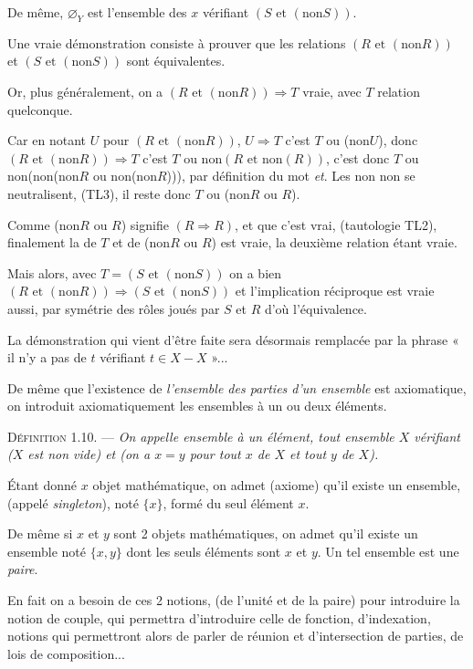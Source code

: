 De même, $\varnothing_Y$ est l'ensemble des $x$ vérifiant $(S\text{ et }(\text{non}S))$.

Une vraie démonstration consiste à prouver que les relations $(R\text{ et }(\text{non}R))$ et $(S\text{ et }(\text{non}S))$ sont équivalentes.

Or, plus généralement, on a $(R\text{ et }(\text{non}R))\Rightarrow T$ vraie, avec $T$ relation quelconque.

Car en notant $U$ pour $(R\text{ et }(\text{non}R))$, $U\Rightarrow T$ c'est $T$ ou (non$U$), donc $(R\text{ et }(\text{non}R))\Rightarrow T$ c'est $T$ ou non$(R\text{ et non}(R))$, c'est donc $T$ ou non(non(non$R$ ou non(non$R$))), par définition du mot \emph{et}. Les non non se neutralisent, (TL3), il reste donc $T$ ou (non$R$ ou $R$).

Comme (non$R$ ou $R$) signifie $(R\Rightarrow R)$, et que c'est vrai, (tautologie TL2), finalement la  de $T$ et de (non$R$ ou $R$) est vraie, la deuxième relation étant vraie.

Mais alors, avec $T=(S\text{ et }(\text{non}S))$ on a bien $(R\text{ et }(\text{non}R))\Rightarrow(S\text{ et }(\text{non}S))$ et l'implication réciproque est vraie aussi, par symétrie des rôles joués par $S$ et $R$ d'où l'équivalence.

La démonstration qui vient d'être faite sera désormais remplacée par la phrase « il n'y a pas de $t$ vérifiant $t\in X-X$ »...

De même que l'existence de \emph{l'ensemble des parties d'un ensemble} est axiomatique, on introduit axiomatiquement les ensembles à un ou deux éléments.

\medskip\noindent\textsc{Définition 1.10.} --- \emph{On appelle ensemble à un élément, tout ensemble $X$ vérifiant ($X$ est non vide) et (on a $x=y$ pour tout $x$ de $X$ et tout $y$ de $X$).}

Étant donné $x$ objet mathématique, on admet (axiome) qu'il existe un ensemble, (appelé \emph{singleton}), noté $\{x\}$, formé du seul élément $x$.

De même si $x$ et $y$ sont 2 objets mathématiques, on admet qu'il existe un ensemble noté $\{x,y\}$ dont les seuls éléments sont $x$ et $y$. Un tel ensemble est une \emph{paire}.

En fait on a besoin de ces 2 notions, (de l'unité et de la paire) pour introduire la notion de couple, qui permettra d'introduire celle de fonction, d'indexation, notions qui permettront alors de parler de réunion et d'intersection de parties, de lois de composition...

